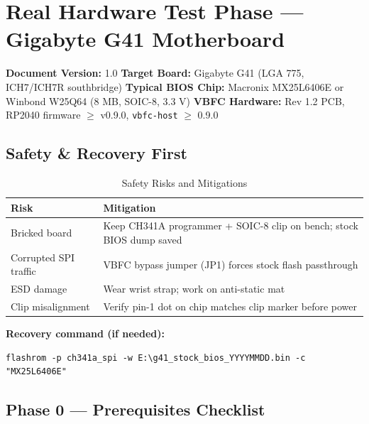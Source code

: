 \section{Real Hardware Test Phase — Gigabyte G41 Motherboard}
\label{app:real_hw_test}

\textbf{Document Version:} 1.0 \quad
\textbf{Target Board:} Gigabyte G41 (LGA 775, ICH7/ICH7R southbridge) \quad
\textbf{Typical BIOS Chip:} Macronix MX25L6406E or Winbond W25Q64 (8 MB, SOIC-8, 3.3 V) \quad
\textbf{VBFC Hardware:} Rev 1.2 PCB, RP2040 firmware $\ge$ v0.9.0, \texttt{vbfc-host} $\ge$ 0.9.0

\subsection*{Safety \& Recovery First}

\begin{table}[h]
\centering
\caption{Safety Risks and Mitigations}
\label{tab:safety}
\begin{tabular}{@{}ll@{}}
\toprule
\textbf{Risk} & \textbf{Mitigation} \\
\midrule
Bricked board & Keep CH341A programmer + SOIC-8 clip on bench; stock BIOS dump saved \\
Corrupted SPI traffic & VBFC bypass jumper (JP1) forces stock flash passthrough \\
ESD damage & Wear wrist strap; work on anti-static mat \\
Clip misalignment & Verify pin-1 dot on chip matches clip marker before power \\
\bottomrule
\end{tabular}
\end{table}

\textbf{Recovery command (if needed):}
\begin{lstlisting}[style=vbfcStyle, caption={Recovery Command}]
flashrom -p ch341a_spi -w E:\g41_stock_bios_YYYYMMDD.bin -c "MX25L6406E"
\end{lstlisting}

\subsection*{Phase 0 — Prerequisites Checklist}

